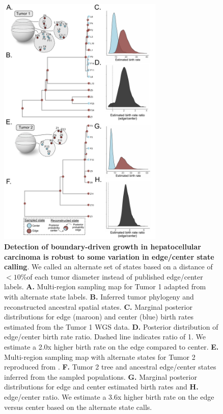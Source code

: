 \documentclass[12pt]{elife_based}
\begin{document}
\begin{figure}
    \centering
    \includegraphics[width=0.7\textwidth]{figures/fig5_wgs_supp_newstates_2.pdf}


\caption{\textbf{Detection of boundary-driven growth in hepatocellular carcinoma is robust to some variation in edge/center state calling}. We called an alternate set of states based on a distance of $<10\% $of each tumor diameter instead of published edge/center labels. \textbf{A.} Multi-region sampling map for Tumor 1 adapted from \cite{Li2022} with alternate state labels. \textbf{B.} Inferred tumor phylogeny and reconstructed ancestral spatial states. \textbf{C.} Marginal posterior distributions for edge (maroon) and center (blue) birth rates estimated from the Tumor 1 WGS data. \textbf{D.} Posterior distribution of edge/center birth rate ratio. Dashed line indicates ratio of 1. We estimate a 2.0x higher birth rate on the edge compared to center. \textbf{E.} Multi-region sampling map with alternate states for Tumor 2 reproduced from \cite{Li2022}. \textbf{F.} Tumor 2 tree and ancestral edge/center states inferred from the sampled populations. \textbf{G.} Marginal posterior distributions for edge and center estimated birth rates and \textbf{H.} edge/center ratio. We estimate a 3.6x higher birth rate on the edge versus center based on the alternate state calls.} 
    
    \label{figS5_wgs_alt_states}
\end{figure} 
\end{document}

